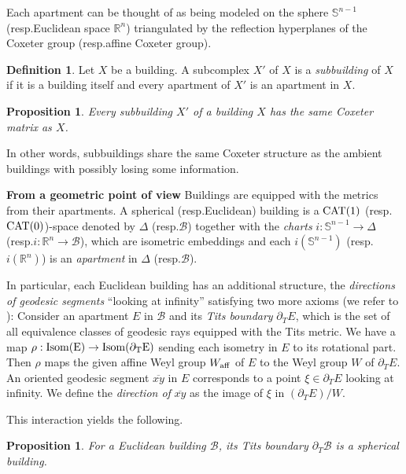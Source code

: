 \documentclass[letterpaper, reqno, 11pt]{amsart}
\newtheorem{Prop}[theorem]{Proposition}
\newtheorem{prop}[theorem]{Proposition}
\theoremstyle{definition}
\newtheorem{definition}[theorem]{Definition}
\theoremstyle{definition}
\theoremstyle{remark}
\newcommand{\cal}{\mathcal}
\begin{document}
Each apartment can be thought of as being modeled on the sphere $\mathbb{S}^{n-1}$ (resp.\@ Euclidean space $\mathbb{R}^n$) triangulated by the reflection hyperplanes of the Coxeter group (resp.\@ affine Coxeter group).


\begin{definition}
    Let $X$ be a building. A subcomplex $X'$ of $X$ is a \textit{subbuilding} of $X$ if it is a building itself and every apartment of $X'$ is an apartment in $X$.
\end{definition}

\begin{prop} \cite[Proposition 4.63]{abramenko2008buildings}
    Every subbuilding $X'$ of a building $X$ has the same Coxeter matrix as $X$.
\end{prop}

In other words, subbuildings share the same Coxeter structure as the ambient buildings with possibly losing some information.

\medskip
\textbf{From a geometric point of view} 
Buildings are equipped with the metrics from their apartments.
A spherical (resp.\@ Euclidean) building is a $\rm{CAT}(1)$ (resp.\@ $\rm{CAT}(0)$)-space denoted by $\Delta$ (resp.\@ $\cal{B}$) together with the \textit{charts} $i:\mathbb{S}^{n-1} \to \Delta$ 
(resp.\@ $i:\mathbb{R}^{n} \to \cal{B}$), which are isometric embeddings and each $i(\mathbb{S}^{n-1})$ (resp.\@ $i(\mathbb{R}^n)$) is an \textit{apartment} in $\Delta$ (resp.\@ $\cal{B}$). 


In particular, each Euclidean building has an additional structure, the \textit{directions of geodesic segments} ``looking at infinity'' satisfying two more axioms (we refer to \cite[Section 4.1.2]{kleiner1997rigidity}):
Consider an apartment $E$ in $\cal{B}$ and its \textit{Tits boundary} $\partial_T E$, which is the set of all equivalence classes of geodesic rays equipped with the Tits metric. We have a map
$\rho: \rm{Isom}(E) \to \rm{Isom}(\partial_T E)$
sending each isometry in $E$ to its rotational part.
Then $\rho$ maps the given affine Weyl group $W_{\rm{aff}}$ of $E$ to the Weyl group $W$ of $\partial_T E$.
An oriented geodesic segment $\overline{xy}$ in $E$ corresponds to a point $\xi \in \partial_T E$ looking at infinity. We define the \textit{direction of} $\overline{xy}$ as the image of $\xi$ in $(\partial_T E)/W$. 

This interaction yields the following.

\begin{Prop} \cite [Proposition 4.2.1]{kleiner1997rigidity}
    For a Euclidean building $\cal{B}$, its Tits boundary $\partial_T\cal{B}$ is a spherical building.
\end{Prop}
\end{document}

